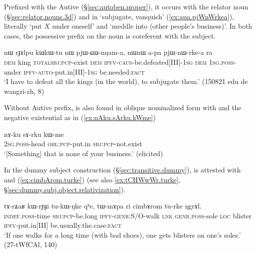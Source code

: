 Prefixed with the Autive  (§\ref{sec:autoben.proper}), it occurs with the relator noun  (§\ref{sec:relator.nouns.3d}) and  in  `subjugate, vanquish' (\ref{ex:apa.pjWnWrkea}), literally `put $X$ under oneself' and  `meddle into (other people's business)'. In both cases, the possessive prefix on the noun is coreferent with the subject.

\begin{exe}
\ex \label{ex:apa.pjWnWrkea}
\gll nɯ rɟɤlpu kɯ\redp{}kɯ-tu nɯ pjɯ-ɕɯ-nŋam-a, nɯnɯ a-pa pjɯ-nɯ-rke-a ra \\
\textsc{dem} king \textsc{total}\redp{}\textsc{sbj}:\textsc{pcp}-exist \textsc{dem} \textsc{ipfv}-\textsc{caus}-be.defeated[III]-\textsc{1sg} \textsc{dem} \textsc{1sg}.\textsc{poss}-under \textsc{ipfv}-\textsc{auto}-put.in[III]-\textsc{1sg} be.needed:\textsc{fact} \\
\glt `I have to defeat all the kings (in the world), to subjugate them.' (150821 edu de wangzi-zh, 8)
\end{exe}


Without Autive prefix,  is also found in oblique nominalized form with  and the negative existential  as in (\ref{ex:nAku.sArku.kWme})

\begin{exe}
\ex \label{ex:nAku.sArku.kWme}
\gll nɤ-ku sɤ-rku kɯ-me \\
\textsc{2sg}.\textsc{poss}-head \textsc{obl}:\textsc{pcp}-put.in \textsc{sbj}:\textsc{pcp}-not.exist  \\
\glt `[Something] that is none of your business.' (elicited)
\end{exe}

In the dummy subject construction (§\ref{sec:transitive.dummy}),  is attested with  and  (\ref{ex:cimbArom.turke}) (see also \ref{ex:tCHWwWr.turke}, §\ref{sec:dummy.subj.object.relativization}).

\begin{exe}
\ex \label{ex:cimbArom.turke}
\gll tɤ-rʑaʁ kɯ-rɲɟi tu-kɯ-ŋke qʰe, tɯ-mɤpa ri cimbɤrom tu-rke ŋgrɤl. \\
\textsc{indef}.\textsc{poss}-time \textsc{sbj}:\textsc{pcp}-be.long \textsc{ipfv}-\textsc{genr}:S/O-walk \textsc{lnk} \textsc{genr}.\textsc{poss}-sole \textsc{loc} blister \textsc{ipfv}-put.in[III] be.usually.the.case:\textsc{fact} \\
\glt `If one walks for a long time (with bad shoes), one gets blisters on one's soles.' (27-tWfCAl, 140)
\end{exe}
 
